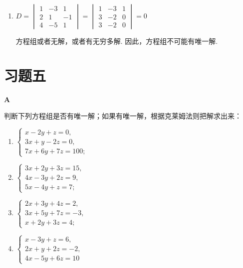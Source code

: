 \begin{solution}
\begin{enumerate}[(1)]
\item $D=\begin{vmatrix}
  1&-3&1\\2&1&-1\\4&-5&1
\end{vmatrix}=\begin{vmatrix}
  1&-3&1\\3&-2&0\\3&-2&0
\end{vmatrix}=0$

方程组或者无解，或者有无穷多解. 因此，方程组不可能有唯一解.
\end{enumerate}
\end{solution}

\section*{习题五}
\begin{center}
  \bfseries A
\end{center}

判断下列方程组是否有唯一解；如果有唯一解，根据克莱姆法则把解求出来：
\begin{multicols}{2}
\begin{enumerate}[(1)]
  \item $\begin{cases}x-2y+z=0,\\3x+y-2z=0,\\7x+6y+7z=100;\end{cases}$
  \item $\begin{cases}3x+2y+3z=15,\\4x-3y+2z=9,\\5x-4y+z=7;\end{cases}$
  \item $\begin{cases}2x+3y+4z=2,\\3x+5y+7z=-3,\\x+2y+3z=4;\end{cases}$
  \item $\begin{cases}x-3y+z=6,\\2x+y+2z=-2,\\4x-5y+6z=10\end{cases}$
\end{enumerate}
\end{multicols}

